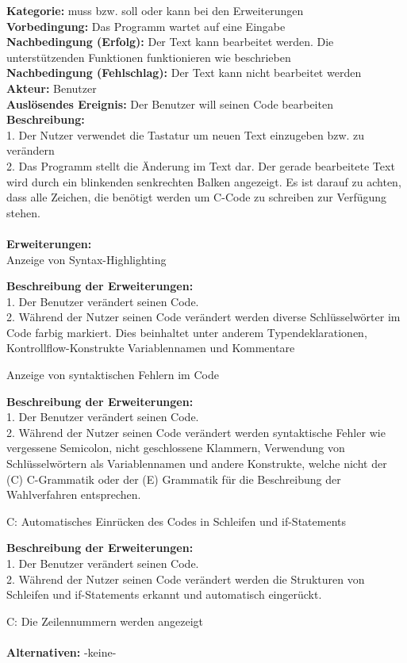 \documentclass[a4paper]{scrreprt}
\begin{document}
\textbf{Kategorie:} muss bzw. soll oder kann bei den Erweiterungen\\
\textbf{Vorbedingung:} Das Programm wartet auf eine Eingabe\\
\textbf{Nachbedingung (Erfolg):} Der Text kann bearbeitet werden. Die unterstützenden Funktionen funktionieren wie beschrieben\\
\textbf{Nachbedingung (Fehlschlag):} Der Text kann nicht bearbeitet werden\\
\textbf{Akteur:} Benutzer \\
\textbf{Auslösendes Ereignis:} Der Benutzer will seinen Code bearbeiten\\
\textbf{Beschreibung:} \\
1. Der Nutzer verwendet die Tastatur um neuen Text einzugeben bzw. zu verändern\\
2. Das Programm stellt die Änderung im Text dar. Der gerade bearbeitete Text wird durch ein blinkenden senkrechten Balken angezeigt. Es ist darauf zu achten, dass alle Zeichen, die benötigt werden um C-Code zu schreiben zur Verfügung stehen.\\\\
\textbf {Erweiterungen:}\\
Anzeige von Syntax-Highlighting
\begin{addmargin}[15pt]{0pt}
\textbf{Beschreibung der Erweiterungen:}\\
1. Der Benutzer verändert seinen Code. \\
2. Während der Nutzer seinen Code verändert werden diverse Schlüsselwörter im Code farbig markiert. Dies beinhaltet unter anderem Typendeklarationen, Kontrollflow-Konstrukte Variablennamen und Kommentare \\
\end{addmargin}
Anzeige von syntaktischen Fehlern im Code
\begin{addmargin}[15pt]{0pt}
\textbf{Beschreibung der Erweiterungen:}\\
1. Der Benutzer verändert seinen Code. \\
2. Während der Nutzer seinen Code verändert werden syntaktische Fehler wie vergessene Semicolon, nicht geschlossene Klammern, Verwendung von Schlüsselwörtern als Variablennamen und andere Konstrukte, welche nicht der (C) C-Grammatik oder der (E) Grammatik für die Beschreibung der Wahlverfahren entsprechen. \\
\end{addmargin}
C: Automatisches Einrücken des Codes in Schleifen und if-Statements 
\begin{addmargin}[15pt]{0pt}
\textbf{Beschreibung der Erweiterungen:}\\
1. Der Benutzer verändert seinen Code. \\
2. Während der Nutzer seinen Code verändert werden die Strukturen von Schleifen und if-Statements erkannt und automatisch eingerückt. \\
\end{addmargin}
C: Die Zeilennummern werden angezeigt \\ \\
\textbf{Alternativen:} -keine- \\
\end{document}

